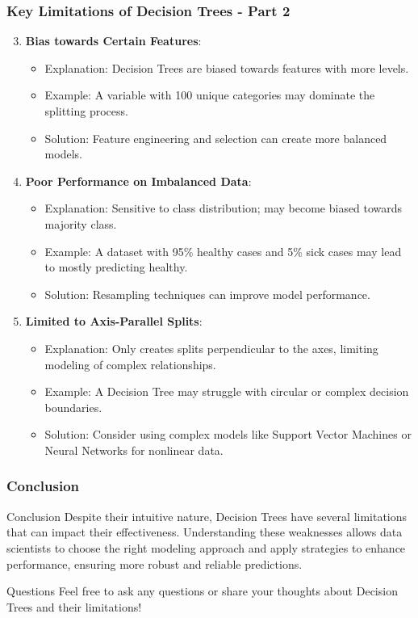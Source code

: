 \documentclass[aspectratio=169]{beamer}
\begin{document}
\begin{frame}[fragile]
    \frametitle{Key Limitations of Decision Trees - Part 2}
    \begin{enumerate}
        \setcounter{enumi}{2} %
        \item \textbf{Bias towards Certain Features}:
            \begin{itemize}
                \item Explanation: Decision Trees are biased towards features with more levels.
                \item Example: A variable with 100 unique categories may dominate the splitting process.
                \item Solution: Feature engineering and selection can create more balanced models.
            \end{itemize}
        
        \item \textbf{Poor Performance on Imbalanced Data}:
            \begin{itemize}
                \item Explanation: Sensitive to class distribution; may become biased towards majority class.
                \item Example: A dataset with 95\% healthy cases and 5\% sick cases may lead to mostly predicting healthy.
                \item Solution: Resampling techniques can improve model performance.
            \end{itemize}

        \item \textbf{Limited to Axis-Parallel Splits}:
            \begin{itemize}
                \item Explanation: Only creates splits perpendicular to the axes, limiting modeling of complex relationships.
                \item Example: A Decision Tree may struggle with circular or complex decision boundaries.
                \item Solution: Consider using complex models like Support Vector Machines or Neural Networks for nonlinear data.
            \end{itemize}
    \end{enumerate}
\end{frame}

\begin{frame}[fragile]
    \frametitle{Conclusion}
    \begin{block}{Conclusion}
        Despite their intuitive nature, Decision Trees have several limitations that can impact their effectiveness. Understanding these weaknesses allows data scientists to choose the right modeling approach and apply strategies to enhance performance, ensuring more robust and reliable predictions.
    \end{block}
    \begin{block}{Questions}
        Feel free to ask any questions or share your thoughts about Decision Trees and their limitations!
    \end{block}
\end{frame}
\end{document}
